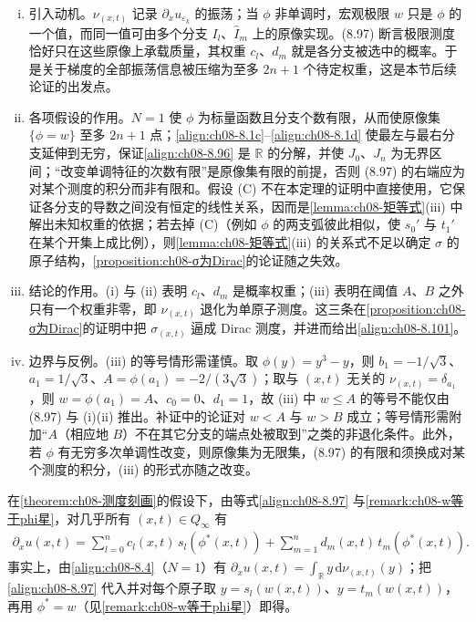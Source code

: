 \documentclass[../../main.tex]{subfiles}%
\begin{document}
\begin{remark}\label{remark:ch08-测度刻画}
\begin{enumerate}[(i)]
\item 引入动机。$\nu_{(x,t)}$ 记录 $\partial_xu_{\varepsilon_k}$ 的振荡；当 $\phi$ 非单调时，宏观极限 $w$ 只是 $\phi$ 的一个值，而同一值可由多个分支 $I_l$、$\widehat I_m$ 上的原像实现。(8.97) 断言极限测度恰好只在这些原像上承载质量，其权重 $c_l$、$d_m$ 就是各分支被选中的概率。于是关于梯度的全部振荡信息被压缩为至多 $2n+1$ 个待定权重，这是本节后续论证的出发点。
\item 各项假设的作用。$N=1$ 使 $\phi$ 为标量函数且分支个数有限，从而使原像集 $\{\phi=w\}$ 至多 $2n+1$ 点；\eqref{align:ch08-8.1c}--\eqref{align:ch08-8.1d} 使最左与最右分支延伸到无穷，保证\eqref{align:ch08-8.96} 是 $\mathbb{R}$ 的分解，并使 $J_0$、$J_n$ 为无界区间；“改变单调特征的次数有限”是原像集有限的前提，否则 (8.97) 的右端应为对某个测度的积分而非有限和。假设 (C) 不在本定理的证明中直接使用，它保证各分支的导数之间没有恒定的线性关系，因而是\cref{lemma:ch08-矩等式}(iii) 中解出未知权重的依据；若去掉 (C)（例如 $\phi$ 的两支弧彼此相似，使 $s_0'$ 与 $t_1'$ 在某个开集上成比例），则\cref{lemma:ch08-矩等式}(iii) 的关系式不足以确定 $\sigma$ 的原子结构，\cref{proposition:ch08-σ为Dirac}的论证随之失效。
\item 结论的作用。(i) 与 (ii) 表明 $c_l$、$d_m$ 是概率权重；(iii) 表明在阈值 $A$、$B$ 之外只有一个权重非零，即 $\nu_{(x,t)}$ 退化为单原子测度。这三条在\cref{proposition:ch08-σ为Dirac}的证明中把 $\sigma_{(x,t)}$ 逼成 Dirac 测度，并进而给出\eqref{align:ch08-8.101}。
\item 边界与反例。(iii) 的等号情形需谨慎。取 $\phi(y)=y^3-y$，则 $b_1=-1/\sqrt3$、$a_1=1/\sqrt3$、$A=\phi(a_1)=-2/(3\sqrt3)$；取与 $(x,t)$ 无关的 $\nu_{(x,t)}=\delta_{a_1}$，则 $w=\phi(a_1)=A$、$c_0=0$、$d_1=1$，故 (iii) 中 $w\leqslant A$ 的等号不能仅由 (8.97) 与 (i)(ii) 推出。补证中的论证对 $w<A$ 与 $w>B$ 成立；等号情形需附加“$A$（相应地 $B$）不在其它分支的端点处被取到”之类的非退化条件。此外，若 $\phi$ 有无穷多次单调性改变，则原像集为无限集，(8.97) 的有限和须换成对某个测度的积分，(iii) 的形式亦随之改变。
\end{enumerate}
\end{remark}

\begin{remark}\label{remark:ch08-导数公式}
在\cref{theorem:ch08-测度刻画}的假设下，由等式\eqref{align:ch08-8.97} 与\cref{remark:ch08-w等于phi星}，对几乎所有 $(x,t)\in Q_\infty$ 有
\begin{align*}
\partial_x u(x,t)=\sum_{l=0}^n c_l(x,t)\,s_l(\phi^*(x,t))+\sum_{m=1}^n d_m(x,t)\,t_m(\phi^*(x,t)).
\end{align*}
事实上，由\eqref{align:ch08-8.4}（$N=1$）有 $\partial_xu(x,t)=\int_{\mathbb{R}}y\,\mathrm{d}\nu_{(x,t)}(y)$；把\eqref{align:ch08-8.97} 代入并对每个原子取 $y=s_l(w(x,t))$、$y=t_m(w(x,t))$，再用 $\phi^*=w$（见\cref{remark:ch08-w等于phi星}）即得。
\end{remark}
\end{document}
